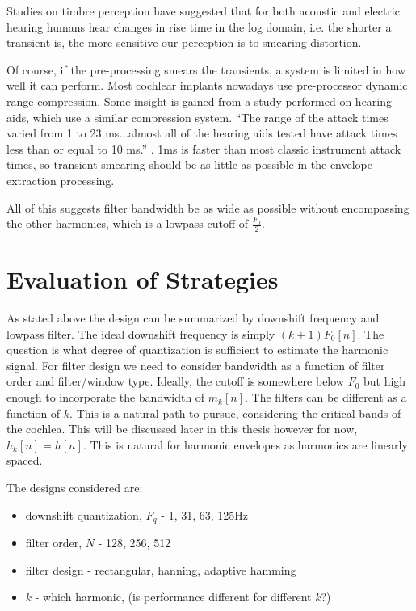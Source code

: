 \documentclass [11pt, proquest,oneside] {ganter_thesis}[2015/03/03]
\begin{document}
Studies on timbre perception \cite{kong2011temporal} have suggested that for both acoustic and electric hearing humans hear changes in rise time in the log domain, i.e. the shorter a transient is, the more sensitive our perception is to smearing distortion.

Of course, if the pre-processing smears the transients, a system is limited in how well it can perform.  Most cochlear implants nowadays use pre-processor dynamic range compression.  Some insight is gained from a study performed on hearing aids, which use a similar compression system.  ``The range of the attack times varied from 1 to 23 ms...almost all of the hearing aids tested have attack times less than or equal to 10 ms.'' \cite{burnett1977attack}.  1ms is faster than most classic instrument attack times, so transient smearing should be as little as possible in the envelope extraction processing.

All of this suggests filter bandwidth be as wide as possible without encompassing the other harmonics, which is a lowpass cutoff of $\frac{F_0}{2}$.



\section{Evaluation of Strategies}

As stated above the design can be summarized by downshift frequency and lowpass filter.  The ideal downshift frequency is simply $(k+1)F_0[n]$.  The question is what degree of quantization is sufficient to estimate the harmonic signal.  For filter design we need to consider bandwidth as a function of filter order and filter/window type.  Ideally, the cutoff is somewhere below $F_0$ but high enough to incorporate the bandwidth of $m_k[n]$.  The filters can be different as a function of $k$.  This is a natural path to pursue, considering the critical bands of the cochlea.  This will be discussed later in this thesis however for now, $h_k[n] = h[n]$.  This is natural for harmonic envelopes as harmonics are linearly spaced.

The designs considered are:

\begin{itemize}
	\item downshift quantization, $F_q$ - 1, 31, 63, 125Hz
	\item filter order, $N$ - 128, 256, 512
	\item filter design - rectangular, hanning, adaptive hamming
	\item $k$ - which harmonic, (is performance different for different $k$?)
\end{itemize}
\end{document}
